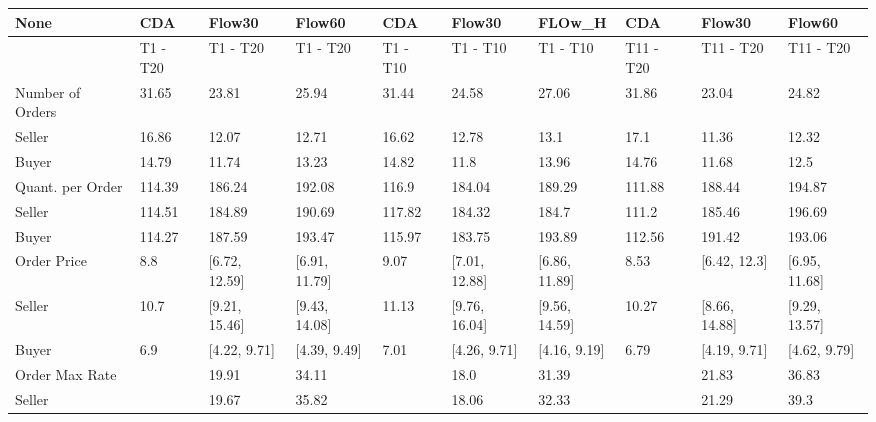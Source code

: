 \begin{tabular}{llllllllll}
\hline
 None                   & CDA      & Flow30         & Flow60         & CDA      & Flow30         & FLOw\_H        & CDA       & Flow30         & Flow60         \\
\hline
                        & T1 - T20 & T1 - T20      & T1 - T20      & T1 - T10 & T1 - T10      & T1 - T10      & T11 - T20 & T11 - T20     & T11 - T20     \\
 Number of Orders       & 31.65    & 23.81         & 25.94         & 31.44    & 24.58         & 27.06         & 31.86     & 23.04         & 24.82         \\
 Seller                 & 16.86    & 12.07         & 12.71         & 16.62    & 12.78         & 13.1          & 17.1      & 11.36         & 12.32         \\
 Buyer                  & 14.79    & 11.74         & 13.23         & 14.82    & 11.8          & 13.96         & 14.76     & 11.68         & 12.5          \\
 Quant. per Order       & 114.39   & 186.24        & 192.08        & 116.9    & 184.04        & 189.29        & 111.88    & 188.44        & 194.87        \\
 Seller                 & 114.51   & 184.89        & 190.69        & 117.82   & 184.32        & 184.7         & 111.2     & 185.46        & 196.69        \\
 Buyer                  & 114.27   & 187.59        & 193.47        & 115.97   & 183.75        & 193.89        & 112.56    & 191.42        & 193.06        \\
 Order Price            & 8.8      & [6.72, 12.59] & [6.91, 11.79] & 9.07     & [7.01, 12.88] & [6.86, 11.89] & 8.53      & [6.42, 12.3]  & [6.95, 11.68] \\
 Seller                 & 10.7     & [9.21, 15.46] & [9.43, 14.08] & 11.13    & [9.76, 16.04] & [9.56, 14.59] & 10.27     & [8.66, 14.88] & [9.29, 13.57] \\
 Buyer                  & 6.9      & [4.22, 9.71]  & [4.39, 9.49]  & 7.01     & [4.26, 9.71]  & [4.16, 9.19]  & 6.79      & [4.19, 9.71]  & [4.62, 9.79]  \\
 Order Max Rate         &          & 19.91         & 34.11         &          & 18.0          & 31.39         &           & 21.83         & 36.83         \\
 Seller                 &          & 19.67         & 35.82         &          & 18.06         & 32.33         &           & 21.29         & 39.3          \\

\end{tabular}
